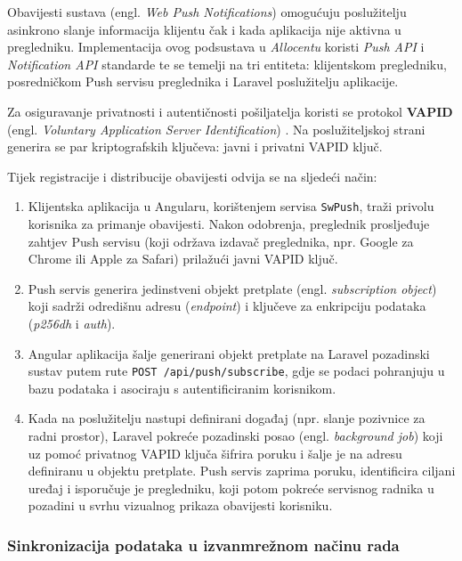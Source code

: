\documentclass[a4paper,12pt,oneside]{article}
\begin{document}
	Obavijesti sustava (engl. \textit{Web Push Notifications}) omogućuju poslužitelju asinkrono slanje informacija klijentu čak i kada aplikacija nije aktivna u pregledniku. Implementacija ovog podsustava u \textit{Allocentu} koristi \textit{Push API} i \textit{Notification API} standarde te se temelji na tri entiteta: klijentskom pregledniku, posredničkom Push servisu preglednika i Laravel poslužitelju aplikacije.
	
	Za osiguravanje privatnosti i autentičnosti pošiljatelja koristi se protokol \textbf{VAPID} (engl. \textit{Voluntary Application Server Identification}) \cite{w_rfc8292_vapid}. Na poslužiteljskoj strani generira se par kriptografskih ključeva: javni i privatni VAPID ključ.
	
	Tijek registracije i distribucije obavijesti odvija se na sljedeći način:
	\begin{enumerate}
		\item Klijentska aplikacija u Angularu, korištenjem servisa \texttt{SwPush}, traži privolu korisnika za primanje obavijesti. Nakon odobrenja, preglednik prosljeđuje zahtjev Push servisu \cite{w_w3c_push} (koji održava izdavač preglednika, npr. Google za Chrome ili Apple za Safari) prilažući javni VAPID ključ.
		
		\item Push servis generira jedinstveni objekt pretplate (engl. \textit{subscription object}) koji sadrži odredišnu adresu (\textit{endpoint}) i ključeve za enkripciju podataka (\textit{p256dh} i \textit{auth}).
		
		\item Angular aplikacija šalje generirani objekt pretplate na Laravel pozadinski sustav putem rute \texttt{POST /api/push/subscribe}, gdje se podaci pohranjuju u bazu podataka i asociraju s autentificiranim korisnikom.
		
		\item Kada na poslužitelju nastupi definirani događaj (npr. slanje pozivnice za radni prostor), Laravel pokreće pozadinski posao (engl. \textit{background job}) koji uz pomoć privatnog VAPID ključa šifrira poruku i šalje je na adresu definiranu u objektu pretplate. Push servis zaprima poruku, identificira ciljani uređaj i isporučuje je pregledniku, koji potom pokreće servisnog radnika u pozadini u svrhu vizualnog prikaza obavijesti korisniku.
	\end{enumerate}

	\subsubsection{Sinkronizacija podataka u izvanmrežnom načinu rada}
	
\end{document}
